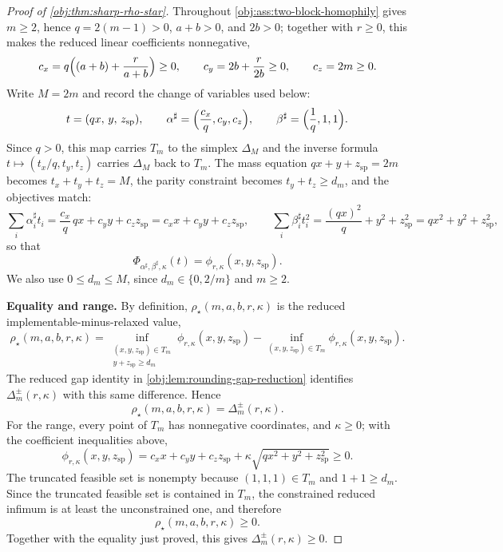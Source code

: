 \begin{proof}[Proof of \cref{obj:thm:sharp-rho-star}]
Throughout \cref{obj:ass:two-block-homophily} gives \(m\ge2\), hence \(q=2(m-1)>0\), \(a+b>0\), and \(2b>0\); together with \(r\ge0\), this makes the reduced linear coefficients nonnegative,
\[
c_x=q\Bigl((a+b)+\frac{r}{a+b}\Bigr)\ge0,
\qquad
c_y=2b+\frac{r}{2b}\ge0,
\qquad
c_z=2m\ge0 .
\]
Write \(M=2m\) and record the change of variables used below:
\[
t=(qx,\,y,\,z_{\mathrm{sp}}),
\qquad
\alpha^\sharp=\Bigl(\frac{c_x}{q},c_y,c_z\Bigr),
\qquad
\beta^\sharp=\Bigl(\frac1q,1,1\Bigr).
\]
Since \(q>0\), this map carries \(T_m\) to the simplex \(\Delta_M\) and the inverse formula \(t\mapsto(t_x/q,t_y,t_z)\) carries \(\Delta_M\) back to \(T_m\).  The mass equation \(qx+y+z_{\mathrm{sp}}=2m\) becomes \(t_x+t_y+t_z=M\), the parity constraint becomes \(t_y+t_z\ge d_m\), and the objectives match:
\[
\sum_i\alpha^\sharp_i t_i=\frac{c_x}{q}\,qx+c_yy+c_zz_{\mathrm{sp}}
=c_xx+c_yy+c_zz_{\mathrm{sp}},
\qquad
\sum_i\beta^\sharp_i t_i^2=\frac{(qx)^2}{q}+y^2+z_{\mathrm{sp}}^2
=qx^2+y^2+z_{\mathrm{sp}}^2,
\]
so that
\[
\Phi_{\alpha^\sharp,\beta^\sharp,\kappa}(t)=\phi_{r,\kappa}(x,y,z_{\mathrm{sp}}).
\]
We also use \(0\le d_m\le M\), since \(d_m\in\{0,2/m\}\) and \(m\ge2\).

\textbf{Equality and range.}
By definition, \(\rho_\star(m,a,b,r,\kappa)\) is the reduced implementable-minus-relaxed value,
\[
\rho_\star(m,a,b,r,\kappa)
=
\inf_{\substack{(x,y,z_{\mathrm{sp}})\in T_m\\ y+z_{\mathrm{sp}}\ge d_m}}\phi_{r,\kappa}(x,y,z_{\mathrm{sp}})
-
\inf_{(x,y,z_{\mathrm{sp}})\in T_m}\phi_{r,\kappa}(x,y,z_{\mathrm{sp}}).
\]
The reduced gap identity in \cref{obj:lem:rounding-gap-reduction} identifies \(\Delta_m^{\pm}(r,\kappa)\) with this same difference.  Hence
\[
\rho_\star(m,a,b,r,\kappa)=\Delta_m^{\pm}(r,\kappa).
\]
For the range, every point of \(T_m\) has nonnegative coordinates, and \(\kappa\ge0\); with the coefficient inequalities above,
\[
\phi_{r,\kappa}(x,y,z_{\mathrm{sp}})
=c_xx+c_yy+c_zz_{\mathrm{sp}}+\kappa\sqrt{qx^2+y^2+z_{\mathrm{sp}}^2}\ge0 .
\]
The truncated feasible set is nonempty because \((1,1,1)\in T_m\) and \(1+1\ge d_m\).  Since the truncated feasible set is contained in \(T_m\), the constrained reduced infimum is at least the unconstrained one, and therefore
\[
\rho_\star(m,a,b,r,\kappa)\ge0 .
\]
Together with the equality just proved, this gives \(\Delta_m^{\pm}(r,\kappa)\ge0\). %


\end{proof}
